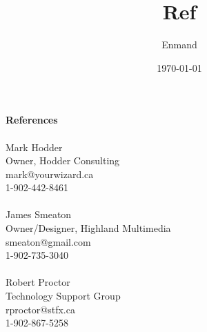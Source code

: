 \documentclass[11pt,letterpaper]{scrartcl}
\title{Ref}
\author{Enmand}
\date{\today}
\begin{document}
\large{\textbf{References}}\\
 \\ 
Mark Hodder\\
Owner, Hodder Consulting\\
mark@yourwizard.ca\\
1-902-442-8461\\
 \\
James Smeaton\\
Owner/Designer, Highland Multimedia\\
smeaton@gmail.com\\
1-902-735-3040\\
 \\
Robert Proctor\\
Technology Support Group\\
rproctor@stfx.ca\\
1-902-867-5258\\
\end{document}
